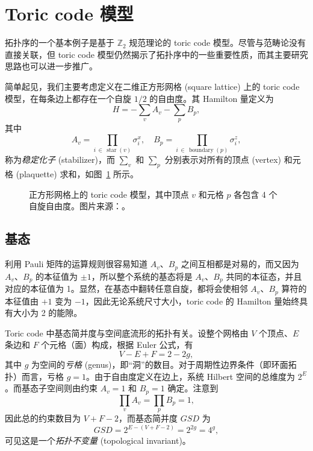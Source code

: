 \section{Toric code 模型}

拓扑序的一个基本例子是基于 $\mathbb{Z}_2$ 规范理论的 toric code 模型\cite{kitaev2003fault,kong2022invitation}。尽管与范畴论没有直接关联，但 toric code 模型仍然揭示了拓扑序中的一些重要性质，而其主要研究思路也可以进一步推广。

简单起见，我们主要考虑定义在二维正方形网格 (square lattice) 上的 toric code 模型，在每条边上都存在一个自旋 $1/2$ 的自由度。其 Hamilton 量定义为
\begin{equation}
  H = -\sum_v A_v - \sum_p B_p,
  \label{eq:toric-code-hamiltonian}
\end{equation}
其中
\begin{equation}
  A_v = \prod_{i\,\in\,\operatorname{star}(v)} \sigma_i^x, \quad
  B_p = \prod_{i\,\in\,\operatorname{boundary}(p)} \sigma_i^z,
\end{equation}
称为\emph{稳定化子} (stabilizer)，而 $\sum_v$ 和 $\sum_p$ 分别表示对所有的顶点 (vertex) 和元格 (plaquette) 求和，如图~\ref{fig:toric-code} 所示。

\begin{figure}[htb]
  \centering
  \caption[正方形网格上的 toric code 模型]{正方形网格上的 toric code 模型，其中顶点 $v$ 和元格 $p$ 各包含 4 个自旋自由度。图片来源：\parencite{kong2022invitation}。}
  \label{fig:toric-code}
\end{figure}

\subsection{基态}

利用 Pauli 矩阵的运算规则很容易知道 $A_v$、$B_p$ 之间互相都是对易的，而又因为 $A_v$、$B_p$ 的本征值为 $\pm1$，所以整个系统的基态将是 $A_v$、$B_p$ 共同的本征态，并且对应的本征值为 1。显然，在基态中翻转任意自旋，都将会使相邻 $A_v$、$B_p$ 算符的本征值由 $+1$ 变为 $-1$，因此无论系统尺寸大小，toric code 的 Hamilton 量始终具有大小为 2 的能隙。

Toric code 中基态简并度与空间底流形的拓扑有关。设整个网格由 $V$ 个顶点、$E$ 条边和 $F$ 个元格（面）构成，根据 Euler 公式，有
\begin{equation}
  V - E + F = 2 - 2g,
\end{equation}
其中 $g$ 为空间的\emph{亏格} (genus)，即“洞”的数目。对于周期性边界条件（即环面拓扑）而言，亏格 $g=1$。由于自由度定义在边上，系统 Hilbert 空间的总维度为 $2^E$。而基态子空间则由约束 $A_v=1$ 和 $B_p=1$ 确定。注意到
\begin{equation}
  \prod_v A_v = \prod_p B_p = 1,
\end{equation}
因此总的约束数目为 $V+F-2$，而基态简并度 $\mathit{GSD}$ 为
\begin{equation}
  \mathit{GSD} = 2^{E-(V+F-2)} = 2^{2g} = 4^g,
\end{equation}
可见这是一个\emph{拓扑不变量} (topological invariant)。

